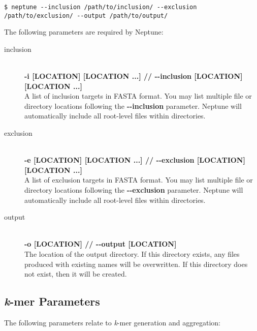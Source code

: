 \documentclass[a4paper,10pt]{article}
\begin{document}
\begin{minipage}{\linewidth}
\begin{lstlisting}[frame=single, style=bash]
$ neptune --inclusion /path/to/inclusion/ --exclusion /path/to/exclusion/ --output /path/to/output/
\end{lstlisting}
\end{minipage}

The following parameters are required by Neptune:

\begin{description}

  \item[inclusion] \hfill \\
  \textbf{-i [LOCATION] [LOCATION ...] // -{}-inclusion [LOCATION] [LOCATION ...]} \hfill \\
  A list of inclusion targets in FASTA format. You may list multiple file or directory locations following the \textbf{-{}-inclusion} parameter. Neptune will automatically include all root-level files within directories.  
  
  \item[exclusion] \hfill \\
  \textbf{-e [LOCATION] [LOCATION ...] // -{}-exclusion [LOCATION] [LOCATION ...]} \hfill \\
  A list of exclusion targets in FASTA format. You may list multiple file or directory locations following the \textbf{-{}-exclusion} parameter. Neptune will automatically include all root-level files within directories.
  
  \item[output] \hfill \\
  \textbf{-o [LOCATION] // -{}-output [LOCATION]} \hfill \\
  The location of the output directory. If this directory exists, any files produced with existing names will be overwritten. If this directory does not exist, then it will be created.
  
\end{description}

\subsection{\textit{k}-mer Parameters}

The following parameters relate to \textit{k}-mer generation and aggregation:
\end{document}
